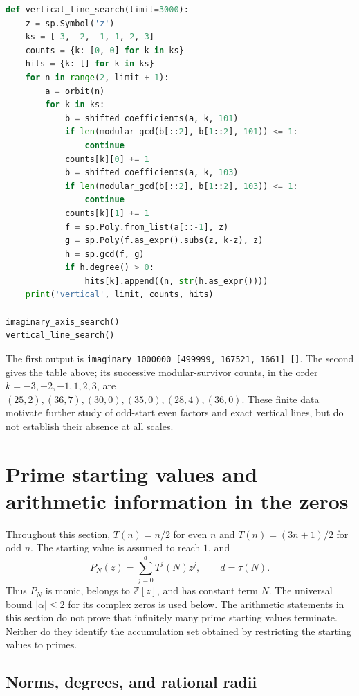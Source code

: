 \documentclass[11pt,a4paper]{article}
\theoremstyle{definition}
\theoremstyle{remark}
\numberwithin{equation}{section}
\begin{document}
\begin{lstlisting}[language=Python]
def vertical_line_search(limit=3000):
    z = sp.Symbol('z')
    ks = [-3, -2, -1, 1, 2, 3]
    counts = {k: [0, 0] for k in ks}
    hits = {k: [] for k in ks}
    for n in range(2, limit + 1):
        a = orbit(n)
        for k in ks:
            b = shifted_coefficients(a, k, 101)
            if len(modular_gcd(b[::2], b[1::2], 101)) <= 1:
                continue
            counts[k][0] += 1
            b = shifted_coefficients(a, k, 103)
            if len(modular_gcd(b[::2], b[1::2], 103)) <= 1:
                continue
            counts[k][1] += 1
            f = sp.Poly.from_list(a[::-1], z)
            g = sp.Poly(f.as_expr().subs(z, k-z), z)
            h = sp.gcd(f, g)
            if h.degree() > 0:
                hits[k].append((n, str(h.as_expr())))
    print('vertical', limit, counts, hits)

imaginary_axis_search()
vertical_line_search()
\end{lstlisting}
\endgroup

The first output is
\texttt{imaginary 1000000 [499999, 167521, 1661] []}.
The second gives the table above; its successive modular-survivor counts,
in the order $k=-3,-2,-1,1,2,3$, are
$(25,2),(36,7),(30,0),(35,0),(28,4),(36,0)$.
These finite data motivate further study of odd-start even factors and
exact vertical lines, but do not establish their absence at all scales.



\section{Prime starting values and arithmetic information in the zeros}
\label{C:sec:prime-zero-arithmetic}

Throughout this section, $T(n)=n/2$ for even $n$ and
$T(n)=(3n+1)/2$ for odd $n$. The starting value is assumed to reach $1$,
and
\[
 P_N(z)=\sum_{j=0}^{d}T^j(N)z^j,\qquad d=\tau(N).
\]
Thus $P_N$ is monic, belongs to $\mathbb Z[z]$, and has constant term $N$.
The universal bound $|\alpha|\leq2$ for its complex zeros is used below.
The arithmetic statements in this section do not prove that infinitely many
prime starting values terminate. Neither do they identify the accumulation
set obtained by restricting the starting values to primes.

\subsection{Norms, degrees, and rational radii}
\end{document}
